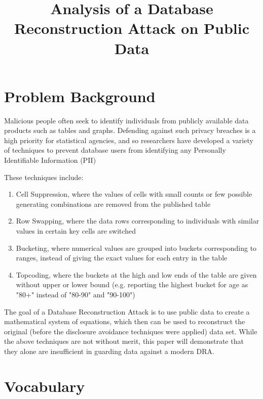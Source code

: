 \documentclass[jou,apacite]{apa6}
\title{Analysis of a Database Reconstruction Attack on Public Data}
\begin{document}
\maketitle

\section{Problem Background}
Malicious people often seek to identify individuals from publicly
available data products such as tables and graphs.
Defending against such privacy breaches is
a high priority for statistical agencies, and so researchers
have developed a variety of techniques to prevent database users
from identifying any Personally Identifiable Information (PII)

These techniques include:
\begin{enumerate}
  \item Cell Suppression, where the values of cells with small counts or few possible
        generating combinations are removed from the published table
  \item Row Swapping, where the data rows corresponding to individuals
        with similar values in certain key cells are switched
  \item Bucketing, where numerical values are grouped into
        buckets corresponding to ranges, instead of giving the exact
        values for each entry in the table
  \item Topcoding, where the buckets at the high and low ends
        of the table are given without upper or lower bound (e.g.
        reporting the highest bucket for age as "80+" instead of
        "80-90" and "90-100")
\end{enumerate}

The goal of a Database Reconstruction Attack is to
use public data to create a mathematical system of equations,
which then can be used to reconstruct the original (before the disclosure
avoidance techniques were applied) data set.
While the above techniques are not without merit, this paper will
demonstrate that they alone are insufficient in guarding data against
a modern DRA.

\section{Vocabulary}
\end{document}
